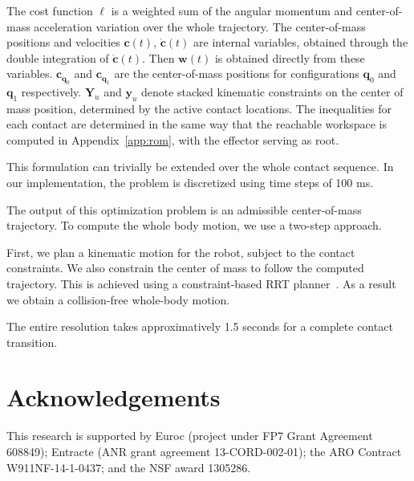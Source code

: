 \documentclass[journal]{IEEEtran}
\newcommand{\commentt}[2]{\textcolor{#1}{\textbf{\textit{[#2]}}}} 	%
\newcommand{\adnote}[1]{\commentt{blue}{AD: #1}}
\providecommand{\DIFaddtex}[1]{#1} %
\providecommand{\DIFdeltex}[1]{} %
\providecommand{\DIFaddbegin}{\protect\color{blue}} %
\providecommand{\DIFaddend}{\protect\color{black}} %
\providecommand{\DIFdelbegin}{\protect\cbdelete} %
\providecommand{\DIFdelend}{} %
\providecommand{\DIFadd}[1]{\texorpdfstring{\DIFaddtex{#1}}{#1}} %
\providecommand{\DIFdel}[1]{\texorpdfstring{\DIFdeltex{#1}}{}} %
\begin{document}
\DIFdelend %
The cost function $\ell$ is a weighted sum of the angular momentum and center-of-mass acceleration variation over the whole trajectory.
The \DIFdelbegin \DIFdel{system dynamics $dyn$ tie together the position, velocity and acceleration of the center of mass.
}\DIFdelend \DIFaddbegin \DIFadd{center-of-mass positions and velocities $\mathbf{c}(t)$, $\mathbf{\dot{c}}(t)$ are internal variables, obtained through the double integration of $\mathbf{\ddot{c}}(t)$.
Then $\mathbf{w}(t)$ is obtained directly from these variables. $\mathbf{c}_{\mathbf{q}_0}$ and $\mathbf{c}_{\mathbf{q}_1}$ are the center-of-mass positions for configurations
 $\mathbf{q}_0$ and $\mathbf{q}_1$ respectively.
}\DIFaddend $\mathbf{Y}_u$ and $\mathbf{y}_u$ denote stacked kinematic constraints on the center of mass position, determined by the active contact locations.
The inequalities for each contact are determined in the same way that the reachable workspace is computed in Appendix~\ref{app:rom}, with
the effector serving as root. %

This formulation can trivially be extended over the whole contact sequence.
In our implementation, the problem is discretized using time steps of 100 ms. 

The output of this optimization problem is an admissible center-of-mass trajectory.
To compute the whole body motion, we use a two-step approach.

First, we plan a kinematic motion for the robot, subject to the contact constraints. We also constrain the center of mass to follow
the computed trajectory. This is achieved using a constraint-based RRT planner~\citep{7759083}. As a result we obtain a collision-free whole-body motion.

The entire resolution takes approximatively 1.5 seconds for a complete contact transition.




\section*{Acknowledgements}
This research is supported by Euroc (project under FP7 Grant Agreement  608849);  Entracte (ANR  grant  agreement  13-CORD-002-01);
the ARO Contract W911NF-14-1-0437; and the NSF award 1305286. %
\end{document}

